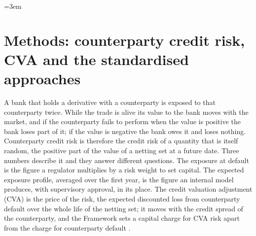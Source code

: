 
\providecommand{\ccrfn}[1]{\nolinkurl{#1}}
\emergencystretch=3em

\section{Methods: counterparty credit risk, CVA and the standardised approaches}
\label{sec:ccr}

A bank that holds a derivative with a counterparty is exposed to that counterparty twice. While the trade is alive its value to the bank
moves with the market, and if the counterparty fails to perform when the value is positive the bank loses part of it; if the value is
negative the bank owes it and loses nothing. Counterparty credit risk is therefore the credit risk of a quantity that is itself random,
the positive part of the value of a netting set at a future date. Three numbers describe it and they answer different questions. The
exposure at default is the figure a regulator multiplies by a risk weight to set capital. The expected exposure profile, averaged over
the first year, is the figure an internal model produces, with supervisory approval, in its place. The credit valuation adjustment
(CVA) is the price of the risk, the expected discounted loss from counterparty default over the whole life of the netting set; it
moves with the credit spread of the counterparty, and the Framework sets a capital charge for CVA risk apart from the charge for counterparty default
\citep{ccr:gregory2020,ccr:brigo2013,ccr:mar50}.

